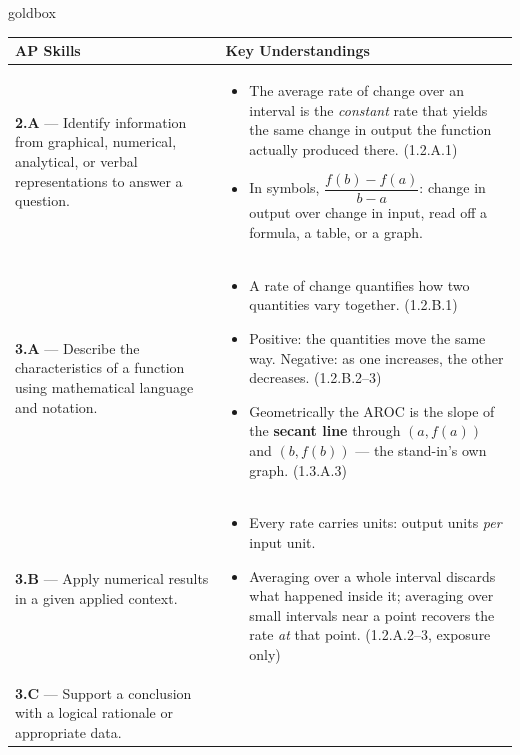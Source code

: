 \documentclass[10pt]{article}
\begin{document}
\renewcommand{\arraystretch}{1.6}
\begin{skillbox}{goldbox}
\begin{tabularx}{\linewidth}{@{}X X@{}}
\textbf{AP Skills} &
\textbf{Key Understandings} \\
\midrule
\textbf{2.A} --- Identify information from graphical, numerical, analytical,
or verbal representations to answer a question. &
\begin{itemize}[leftmargin=1.2em,itemsep=2pt,topsep=0pt]
  \item The average rate of change over an interval is the \textit{constant}
        rate that yields the same change in output the function actually
        produced there. (1.2.A.1)
  \item In symbols, $\dfrac{f(b)-f(a)}{b-a}$: change in output over change in
        input, read off a formula, a table, or a graph.
\end{itemize} \\
\textbf{3.A} --- Describe the characteristics of a function using
mathematical language and notation. &
\begin{itemize}[leftmargin=1.2em,itemsep=2pt,topsep=0pt]
  \item A rate of change quantifies how two quantities vary together.
        (1.2.B.1)
  \item Positive: the quantities move the same way. Negative: as one
        increases, the other decreases. (1.2.B.2--3)
  \item Geometrically the AROC is the slope of the \textbf{secant line}
        through $(a, f(a))$ and $(b, f(b))$ --- the stand-in's own graph.
        (1.3.A.3)
\end{itemize} \\
\textbf{3.B} --- Apply numerical results in a given applied context. &
\begin{itemize}[leftmargin=1.2em,itemsep=2pt,topsep=0pt]
  \item Every rate carries units: output units \textit{per} input unit.
  \item Averaging over a whole interval discards what happened inside it;
        averaging over small intervals near a point recovers the rate
        \textit{at} that point. (1.2.A.2--3, exposure only)
\end{itemize} \\
\textbf{3.C} --- Support a conclusion with a logical rationale or
appropriate data. &
\begin{itemize}[leftmargin=1.2em,itemsep=2pt,topsep=0pt]

\end{itemize}
\end{tabularx}
\end{skillbox}
\end{document}
